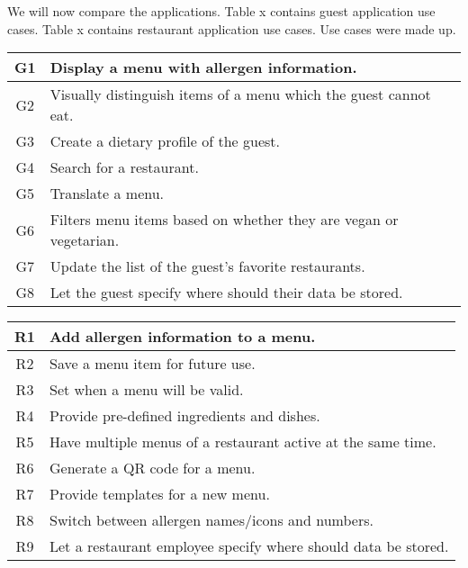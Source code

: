 We will now compare the applications.
Table x contains guest application use cases.
Table x contains restaurant application use cases.
Use cases were made up.

\begin{center}
  \begin{tabular}{| c | l |}
    \hline
    G1 & Display a menu with allergen information. &  \\
    \hline
    G2 & Visually distinguish items of a menu which the guest cannot eat. &  \\
    \hline
    G3 & Create a dietary profile of the guest. &  \\
    \hline
    G4 & Search for a restaurant. \\
    \hline
    G5 & Translate a menu. &  \\
    \hline
    G6 & Filters menu items based on whether they are vegan or vegetarian. &  \\
    \hline
    G7 & Update the list of the guest's favorite restaurants. &  \\
    \hline
    G8 & Let the guest specify where should their data be stored. & \\ 
    \hline
  \end{tabular}
  \newline
\end{center}

\begin{center}
  \begin{tabular}{| c | l |}
    \hline
    R1 & Add allergen information to a menu. \\
    \hline
    R2 & Save a menu item for future use. \\
    \hline
    R3 & Set when a menu will be valid. \\
    \hline
    R4 & Provide pre-defined ingredients and dishes. \\
    \hline
    R5 & Have multiple menus of a restaurant active at the same time. \\    
    \hline
    R6 & Generate a QR code for a menu. \\
    \hline 
    R7 & Provide templates for a new menu. \\
    \hline 
    R8 & Switch between allergen names/icons and numbers. \\
    \hline 
    R9 & Let a restaurant employee specify where should data be stored. \\
    \hline
  \end{tabular}
  \newline
\end{center}

